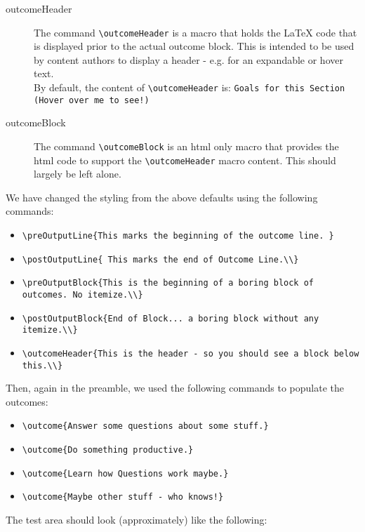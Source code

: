 \documentclass{ximera}
\renewcommand{\preOutputLine}{This marks the beginning of the outcome line. }
\renewcommand{\postOutputLine}{ This marks the end of Outcome Line.\\}
\renewcommand{\preOutputBlock}{This is the beginning of a boring block of outcomes. No itemize.\\}
\renewcommand{\postOutputBlock}{End of Block... a boring block without any itemize.\\}
\renewcommand{\outcomeHeader}{This is the header - so you should see a block below this.\\}
\begin{document}
\begin{description}
    \item[outcomeHeader] The command \verb|\outcomeHeader| is a macro that holds the LaTeX code that is displayed prior to the actual outcome block. 
            This is intended to be used by content authors to display a header - e.g. for an expandable or hover text.\\
            By default, the content of \verb|\outcomeHeader| is: \verb|Goals for this Section (Hover over me to see!)|
    \item[outcomeBlock] The command \verb|\outcomeBlock| is an html only macro that provides the html code to support the \verb|\outcomeHeader| macro content. 
        This should largely be left alone.
\end{description}

We have changed the styling from the above defaults using the following commands:
\begin{itemize}
    \item \verb|\preOutputLine{This marks the beginning of the outcome line. } |
    \item \verb|\postOutputLine{ This marks the end of Outcome Line.\\} |
    \item \verb|\preOutputBlock{This is the beginning of a boring block of outcomes. No itemize.\\} |
    \item \verb|\postOutputBlock{End of Block... a boring block without any itemize.\\} |
    \item \verb|\outcomeHeader{This is the header - so you should see a block below this.\\} |
\end{itemize}

Then, again in the preamble, we used the following commands to populate the outcomes:
\begin{itemize}
    \item \verb|\outcome{Answer some questions about some stuff.} |
    \item \verb|\outcome{Do something productive.} |
    \item \verb|\outcome{Learn how Questions work maybe.} |
    \item \verb|\outcome{Maybe other stuff - who knows!} |
\end{itemize}

The test area should look (approximately) like the following:
\end{document}
